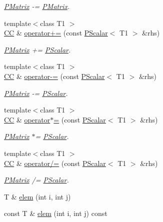 \begin{DoxyCompactItemize}
\begin{DoxyCompactList}\small\item\em \mbox{\hyperlink{classENSEM_1_1PMatrix}{P\+Matrix}} -\/= \mbox{\hyperlink{classENSEM_1_1PMatrix}{P\+Matrix}}. \end{DoxyCompactList}\item 
{\footnotesize template$<$class T1 $>$ }\\\mbox{\hyperlink{classENSEM_1_1PMatrix_a744bac549029029effe32dc1705660ec}{CC}} \& \mbox{\hyperlink{classENSEM_1_1PMatrix_a141db586d4797230e05d41ab13c12a1e}{operator+=}} (const \mbox{\hyperlink{classENSEM_1_1PScalar}{P\+Scalar}}$<$ T1 $>$ \&rhs)
\begin{DoxyCompactList}\small\item\em \mbox{\hyperlink{classENSEM_1_1PMatrix}{P\+Matrix}} += \mbox{\hyperlink{classENSEM_1_1PScalar}{P\+Scalar}}. \end{DoxyCompactList}\item 
{\footnotesize template$<$class T1 $>$ }\\\mbox{\hyperlink{classENSEM_1_1PMatrix_a744bac549029029effe32dc1705660ec}{CC}} \& \mbox{\hyperlink{classENSEM_1_1PMatrix_ad33381d53cc105f6f64869316aa0e2c2}{operator-\/=}} (const \mbox{\hyperlink{classENSEM_1_1PScalar}{P\+Scalar}}$<$ T1 $>$ \&rhs)
\begin{DoxyCompactList}\small\item\em \mbox{\hyperlink{classENSEM_1_1PMatrix}{P\+Matrix}} -\/= \mbox{\hyperlink{classENSEM_1_1PScalar}{P\+Scalar}}. \end{DoxyCompactList}\item 
{\footnotesize template$<$class T1 $>$ }\\\mbox{\hyperlink{classENSEM_1_1PMatrix_a744bac549029029effe32dc1705660ec}{CC}} \& \mbox{\hyperlink{classENSEM_1_1PMatrix_a4c25aeda146eb61d41abf6cf625a6153}{operator$\ast$=}} (const \mbox{\hyperlink{classENSEM_1_1PScalar}{P\+Scalar}}$<$ T1 $>$ \&rhs)
\begin{DoxyCompactList}\small\item\em \mbox{\hyperlink{classENSEM_1_1PMatrix}{P\+Matrix}} $\ast$= \mbox{\hyperlink{classENSEM_1_1PScalar}{P\+Scalar}}. \end{DoxyCompactList}\item 
{\footnotesize template$<$class T1 $>$ }\\\mbox{\hyperlink{classENSEM_1_1PMatrix_a744bac549029029effe32dc1705660ec}{CC}} \& \mbox{\hyperlink{classENSEM_1_1PMatrix_ade8246cb542a62e3368d33026885ca59}{operator/=}} (const \mbox{\hyperlink{classENSEM_1_1PScalar}{P\+Scalar}}$<$ T1 $>$ \&rhs)
\begin{DoxyCompactList}\small\item\em \mbox{\hyperlink{classENSEM_1_1PMatrix}{P\+Matrix}} /= \mbox{\hyperlink{classENSEM_1_1PScalar}{P\+Scalar}}. \end{DoxyCompactList}\item 
T \& \mbox{\hyperlink{classENSEM_1_1PMatrix_a358c5f1cd954ddda32677d9ad8765ef2}{elem}} (int i, int j)
\item 
const T \& \mbox{\hyperlink{classENSEM_1_1PMatrix_a5cacb33b2dcd4c33a9d3a135528a8bdf}{elem}} (int i, int j) const
\end{DoxyCompactItemize}


